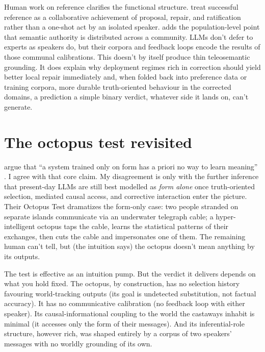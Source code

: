 \documentclass[12pt]{article}
\begin{document}
Human work on reference clarifies the functional structure. \textcite{clark_wilkes_gibbs_1986_referring} treat successful reference as a collaborative achievement of proposal, repair, and ratification rather than a one-shot act by an isolated speaker. \textcite{putnam_1975_meaning_of_meaning} adds the population-level point that semantic authority is distributed across a community. LLMs don't defer to experts as speakers do, but their corpora and feedback loops encode the results of those communal calibrations. This doesn't by itself produce thin teleosemantic grounding. It does explain why deployment regimes rich in correction should yield better local repair immediately and, when folded back into preference data or training corpora, more durable truth-oriented behaviour in the corrected domains, a prediction a simple binary verdict, whatever side it lands on, can't generate.

\section{The octopus test revisited}
\label{sec:octopus}

\textcite{bender_koller_2020_climbing_towards_nlu} argue that \enquote{a system trained only on form has a priori no way to learn meaning} \citep[1]{bender_koller_2020_climbing_towards_nlu}. I agree with that core claim. My disagreement is only with the further inference that present-day LLMs are still best modelled as \emph{form alone} once truth-oriented selection, mediated causal access, and corrective interaction enter the picture. Their Octopus Test dramatizes the form-only case: two people stranded on separate islands communicate via an underwater telegraph cable; a hyper-intelligent octopus taps the cable, learns the statistical patterns of their exchanges, then cuts the cable and impersonates one of them. The remaining human can't tell, but (the intuition says) the octopus doesn't mean anything by its outputs.

The test is effective as an intuition pump. But the verdict it delivers depends on what you hold fixed. The octopus, by construction, has no selection history favouring world-tracking outputs (its goal is undetected substitution, not factual accuracy). It has no communicative calibration (no feedback loop with either speaker). Its causal-informational coupling to the world the castaways inhabit is minimal (it accesses only the form of their messages). And its inferential-role structure, however rich, was shaped entirely by a corpus of two speakers' messages with no worldly grounding of its own.
\end{document}
